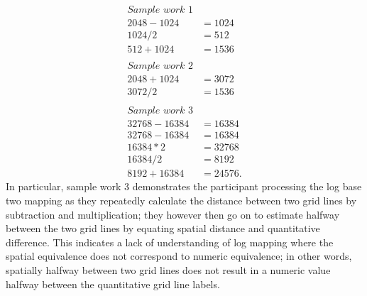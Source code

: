 \documentclass[print]{nuthesis}
\begin{document}
\begin{align}
\textit{Sample work 1} \nonumber\\
2048-1024 &= 1024 \nonumber \\
1024/2 &= 512 \nonumber\\
512+1024 &= 1536 \nonumber
\nonumber \\ 
\nonumber \\
\textit{Sample work 2} \nonumber\\
2048 + 1024 & =3072 \nonumber\\
3072/2 & =1536 \nonumber
\nonumber \\ 
\nonumber \\
\textit{Sample work 3} \nonumber\\
32768-16384&=16384  \nonumber\\
32768-16384&=16384  \nonumber\\
16384*2&=32768  \nonumber\\
16384/2&=8192  \nonumber\\
8192+16384&=24576.  \nonumber
\end{align}
In particular, sample work 3 demonstrates the participant processing the log base two mapping as they repeatedly calculate the distance between two grid lines by subtraction and multiplication; they however then go on to estimate halfway between the two grid lines by equating spatial distance and quantitative difference.
This indicates a lack of understanding of log mapping where the spatial equivalence does not correspond to numeric equivalence; in other words, spatially halfway between two grid lines does not result in a numeric value halfway between the quantitative grid line labels.
\end{document}
